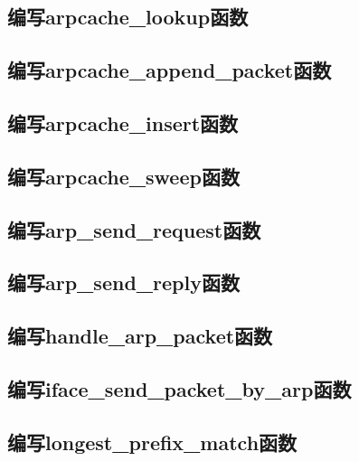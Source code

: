 \documentclass{zjureport}
\begin{document}
  \subsection{编写arpcache\_lookup函数}
      

  \newpage
  \subsection{编写arpcache\_append\_packet函数}
      

  \newpage
  \subsection{编写arpcache\_insert函数}
    

  \newpage
  \subsection{编写arpcache\_sweep函数}
    

  \newpage
  \subsection{编写arp\_send\_request函数}
    

  \newpage
  \subsection{编写arp\_send\_reply函数}
    

  \newpage
  \subsection{编写handle\_arp\_packet函数}
    

  \subsection{编写iface\_send\_packet\_by\_arp函数}
    

  \newpage
  \subsection{编写longest\_prefix\_match函数}
    
\end{document}

